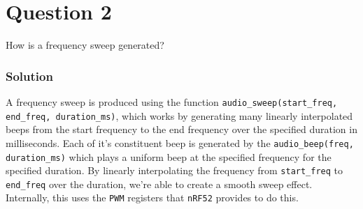 \section*{Question 2}

How is a frequency sweep generated?

\subsubsection*{Solution}

A frequency sweep is produced using the function \texttt{audio\_sweep\@(start\_freq, end\_freq, duration\_ms)}, which works by generating many linearly interpolated beeps from the start frequency to the end frequency over the specified duration in milliseconds.
Each of it's constituent beep is generated by the \texttt{audio\_beep\@(freq, duration\_ms)} which plays a uniform beep at the specified frequency for the specified duration.
By linearly interpolating the frequency from \texttt{start\_freq} to \texttt{end\_freq} over the duration, we're able to create a smooth sweep effect.
Internally, this uses the \texttt{PWM} registers that \texttt{nRF52} provides to do this.

